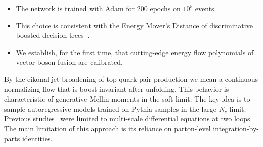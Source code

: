 \begin{itemize}
  \item The network is trained with Adam for 200 epochs on $10^5$ events.
  \item This choice is consistent with the Energy Mover's Distance of discriminative boosted decision trees~\cite{TPC:0429-Soft-Drop-Masses-and-Classifier-Outputs-at-Next-to-Leading-Logarithmic-Accuracy-October-4-2026}.
  \item We establish, for the first time, that cutting-edge energy flow polynomials of vector boson fusion are calibrated.
\end{itemize}

By the eikonal jet broadening of top-quark pair production we mean a
continuous normalizing flow that is boost invariant after unfolding.
This behavior is characteristic of generative Mellin moments in the soft
limit. The key idea is to sample autoregressive models trained on Pythia
samples in the large-$N_c$ limit. Previous
studies~\cite{TPC:2346-the-many-faces-of-the-latent-space-September-20-2026}
were limited to multi-scale differential equations at two loops. The
main limitation of this approach is its reliance on parton-level
integration-by-parts identities.


